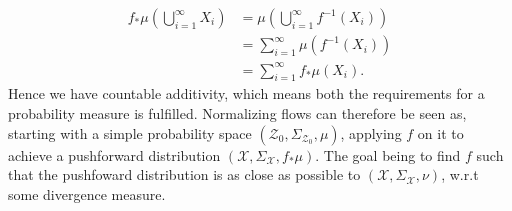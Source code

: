 \begin{align*}
    f_* \mu\left(\bigcup\limits_{i=1}^{\infty} X_i\right) &= \mu\left(\bigcup\limits_{i=1}^{\infty} f^{-1}(X_i)\right)\\
                                                               &= \sum_{i=1}^{\infty} \mu\left(f^{-1}(X_i)\right)\\
                                                               &= \sum_{i=1}^{\infty} f_*\mu(X_i).
\end{align*}
Hence we have countable additivity, which means both the requirements for a probability measure is fulfilled. Normalizing flows
can therefore be seen as, starting with a simple probability space \((\mathcal{Z}_0, \Sigma_{\mathcal{Z}_0}, \mu)\), applying
\(f\) on it to achieve a pushforward distribution \((\mathcal{X}, \Sigma_{\mathcal{X}}, f_*\mu)\). The 
goal being to find \(f\) such that the pushfoward distribution is as close as possible to 
\((\mathcal{X}, \Sigma_{\mathcal{X}}, \nu)\), w.r.t some divergence measure.

